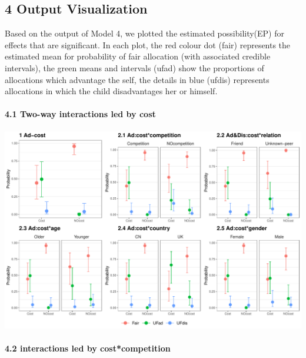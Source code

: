 \documentclass[
]{article}
\begin{document}
\hypertarget{output-visualization}{%
\subsection{4 Output Visualization}\label{output-visualization}}

Based on the output of Model 4, we plotted the estimated possibility(EP)
for effects that are significant. In each plot, the red colour dot
(fair) represents the estimated mean for probability of fair allocation
(with associated credible intervals), the green means and intervals
(ufad) show the proportions of allocations which advantage the self, the
details in blue (ufdis) represents allocations in which the child
disadvantages her or himself.

\hypertarget{two-way-interactions-led-by-cost}{%
\paragraph{4.1 Two-way interactions led by
cost}\label{two-way-interactions-led-by-cost}}

\includegraphics{Registration_The-Dynamic-Cost-Model_files/figure-latex/plot 4.1-1.pdf}

\hypertarget{interactions-led-by-costcompetition}{%
\paragraph{4.2 interactions led by
cost*competition}\label{interactions-led-by-costcompetition}}
\end{document}

